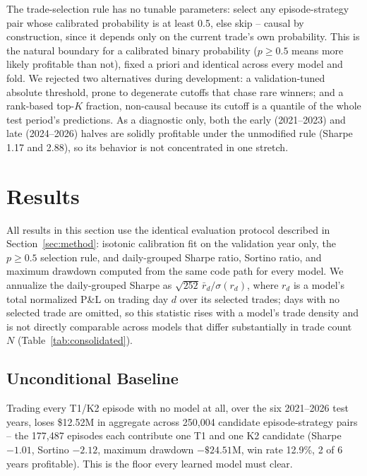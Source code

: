 \documentclass[sigconf,review]{acmart}
\begin{document}
The trade-selection rule has no tunable parameters: select any episode-strategy pair whose calibrated probability is at least 0.5, else skip -- causal by construction, since it depends only on the current trade's own probability. This is the natural boundary for a calibrated binary probability ($p\ge0.5$ means more likely profitable than not), fixed a priori and identical across every model and fold. We rejected two alternatives during development: a validation-tuned absolute threshold, prone to degenerate cutoffs that chase rare winners; and a rank-based top-$K$ fraction, non-causal because its cutoff is a quantile of the whole test period's predictions. As a diagnostic only, both the early (2021--2023) and late (2024--2026) halves are solidly profitable under the unmodified rule (Sharpe 1.17 and 2.88), so its behavior is not concentrated in one stretch.

\section{Results}
\label{sec:results}

All results in this section use the identical evaluation protocol described in Section~\ref{sec:method}: isotonic calibration fit on the validation year only, the $p \ge 0.5$ selection rule, and daily-grouped Sharpe ratio, Sortino ratio, and maximum drawdown computed from the same code path for every model. We annualize the daily-grouped Sharpe as $\sqrt{252}\,\bar{r}_d/\sigma(r_d)$, where $r_d$ is a model's total normalized P\&L on trading day $d$ over its selected trades; days with no selected trade are omitted, so this statistic rises with a model's trade density and is not directly comparable across models that differ substantially in trade count $N$ (Table~\ref{tab:consolidated}).

\subsection{Unconditional Baseline}
Trading every T1/K2 episode with no model at all, over the six 2021--2026 test years, loses \$12.52M in aggregate across 250{,}004 candidate episode-strategy pairs -- the 177{,}487 episodes each contribute one T1 and one K2 candidate (Sharpe $-1.01$, Sortino $-2.12$, maximum drawdown $-\$24.51$M, win rate 12.9\%, 2 of 6 years profitable). This is the floor every learned model must clear.
\end{document}
